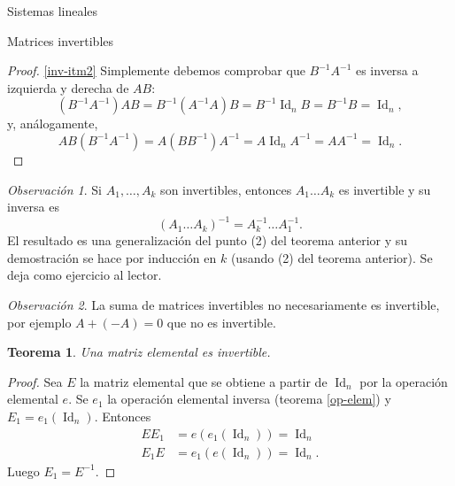 \documentclass[a4paper,12pt,twoside,spanish,reqno]{amsbook}
\numberwithin{equation}{section}
\newtheorem{teorema}{Teorema}[section]
\theoremstyle{definition}
\theoremstyle{remark}
\newtheorem*{observacion*}{Observaci\'on}
\newcommand{\Id}{\operatorname{Id}}
\begin{document}
\begin{chapter}{Sistemas lineales}
\begin{section}{Matrices invertibles}
\begin{proof}
                    \ref{inv-itm2} Simplemente debemos comprobar que $B^{-1}A^{-1}$ es inversa a izquierda y derecha de $AB$:
                    \begin{equation*}
                    (B^{-1}A^{-1})AB = B^{-1}(A^{-1}A)B = B^{-1}\Id_nB =B^{-1}B = \Id_n,
                    \end{equation*}
                    y,  análogamente,
                    \begin{equation*}
                    AB(B^{-1}A^{-1}) = A(BB^{-1})A^{-1} = A\Id_nA^{-1} =AA^{-1} = \Id_n.
                    \end{equation*} 
                \end{proof}
            
            
            \begin{observacion*}
                Si $A_1,\ldots,A_k$  son invertibles,  entonces $A_1\ldots A_k$ es invertible y su inversa es  $$(A_1\ldots A_k)^{-1} = A_k^{-1}\ldots A_1^{-1} .$$
                El resultado es una generalización del punto (2) del teorema anterior y su demostración se hace por inducción en $k$ (usando (2)  del teorema anterior). Se deja como ejercicio al lector. 
            \end{observacion*}
            
            \begin{observacion*}
                La suma de matrices invertibles no necesariamente es invertible, por ejemplo $A+ (-A)= 0$ que no es invertible. 
            \end{observacion*}	
            
            
            \begin{teorema}\label{th-elmental-impl-invertible}
                Una matriz elemental es invertible.
            \end{teorema}
            \begin{proof}
                Sea $E$ la matriz elemental que se obtiene a partir de $\Id_n$ por la operación elemental $e$. Se $e_1$ la operación elemental inversa (teorema \ref{op-elem}) y $E_1 = e_1(\Id_n)$. Entonces 
                \begin{align*}
                EE_1 &= e(e_1(\Id_n)) = \Id_n \\
                E_1E &= e_1(e(\Id_n)) = \Id_n.
                \end{align*}
                Luego  $E_1 = E^{-1}$. 
            \end{proof}	
            

\end{section}
\end{chapter}
\end{document}
